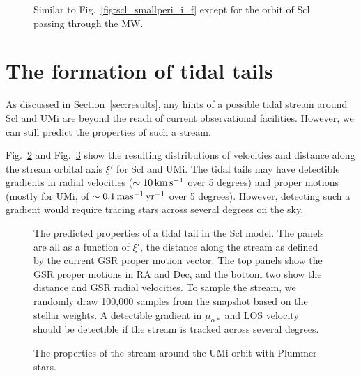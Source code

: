 \begin{figure}
\centering
{}
\caption[Sculptor MW-impact density profiles]{Similar to
Fig.~\ref{fig:scl_smallperi_i_f} except for the orbit of Scl passing
through the MW.}\label{fig:scl_mw_impact_i_f}
\end{figure}

\section{The formation of tidal
tails}\label{the-formation-of-tidal-tails}

As discussed in Section~\ref{sec:results}, any hints of a possible tidal
stream around Scl and UMi are beyond the reach of current observational
facilities. However, we can still predict the properties of such a
stream.

Fig.~\ref{fig:scl_tidal_stream} and Fig.~\ref{fig:umi_tidal_stream} show
the resulting distributions of velocities and distance along the stream
orbital axis \(\xi'\) for Scl and UMi. The tidal tails may have
detectible gradients in radial velocities (\(\sim 10\,{\rm km\,s^{-1}}\) over 5
degrees) and proper motions (mostly for UMi, of \(\sim 0.1\,{\rm mas^{-1}\,yr^{-1}}\)
over 5 degrees). However, detecting such a gradient would require
tracing stars across several degrees on the sky.

\begin{figure}
\centering
{}
\caption[Sculptor predicted stream]{The predicted properties of a tidal
tail in the Scl model. The panels are all as a function of \(\xi'\), the
distance along the stream as defined by the current GSR proper motion
vector. The top panels show the GSR proper motions in RA and Dec, and
the bottom two show the distance and GSR radial velocities. To sample
the stream, we randomly draw 100,000 samples from the snapshot based on
the stellar weights. A detectible gradient in \(\mu_{\alpha*}\) and LOS
velocity should be detectible if the stream is tracked across several
degrees.}\label{fig:scl_tidal_stream}
\end{figure}

\begin{figure}
\centering
{}
\caption[Ursa Minor predicted stream]{The properties of the stream
around the UMi \smallperi{} orbit with Plummer
stars.}\label{fig:umi_tidal_stream}
\end{figure}


